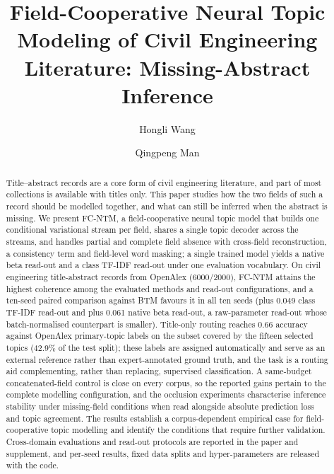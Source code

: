 \documentclass[Journal,letterpaper,NoLists]{ascelike-new}
\begin{document}
\title{Field-Cooperative Neural Topic Modeling of Civil Engineering Literature:
Missing-Abstract Inference}

\author[1]{Hongli Wang}
\author[1]{Qingpeng Man}


\maketitle

\begin{abstract}
Title--abstract records are a core form of civil engineering literature, and part of most
collections is available with titles only. This paper studies how the two fields of such a record
should be modelled together, and what can still be inferred when the abstract is missing. We
present FC-NTM, a field-cooperative neural topic model that builds one conditional variational
stream per field, shares a single topic decoder across the streams, and handles partial and
complete field absence with cross-field reconstruction, a consistency term and field-level word
masking; a single trained model yields a native beta read-out and a class TF-IDF read-out under
one evaluation vocabulary. On civil engineering title-abstract records from OpenAlex (6000/2000),
FC-NTM attains the highest coherence among the evaluated methods and read-out configurations, and
a ten-seed paired comparison against BTM favours it in all ten seeds (plus 0.049 class TF-IDF
read-out and plus 0.061 native beta read-out, a raw-parameter read-out whose batch-normalised
counterpart is smaller). Title-only routing reaches 0.66 accuracy against OpenAlex primary-topic labels on the subset
covered by the fifteen selected topics (42.9\% of the test split); these labels are assigned
automatically and serve as an external reference rather than expert-annotated ground truth, and
the task is a routing aid complementing, rather than replacing, supervised classification. A same-budget concatenated-field control is close on
every corpus, so the reported gains pertain to the complete modelling configuration, and the
occlusion experiments characterise inference stability under missing-field conditions when read
alongside absolute prediction loss and topic agreement. The results establish a corpus-dependent
empirical case for field-cooperative topic modelling and identify the conditions that require
further validation. Cross-domain evaluations and read-out protocols are reported in the paper and
supplement, and per-seed results, fixed data splits and hyper-parameters are released with the
code.
\end{abstract}
\end{document}
